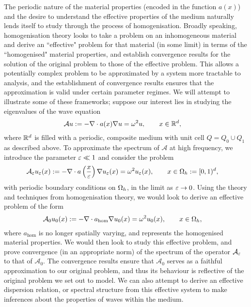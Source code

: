 The periodic nature of the material properties (encoded in the function $a(x)$) and the desire to understand the effective properties of the medium naturally lends itself to study through the process of homogenisation.
Broadly speaking, homogenisation theory looks to take a problem on an inhomogeneous material and derive an ``effective" problem for that material (in some limit) in terms of the ``homogenised" material properties, and establish convergence results for the solution of the original problem to those of the effective problem.
This allows a potentially complex problem to be approximated by a system more tractable to analysis, and the establishment of convergence results ensures that the approximation is valid under certain parameter regimes.
We will attempt to illustrate some of these frameworks; suppose our interest lies in studying the eigenvalues of the wave equation
\begin{align*}
	\mathcal{A}u &:= -\nabla\cdot a(x)\nabla u = \omega^2 u, \qquad x\in\mathbb{R}^d,
\end{align*}
where $\mathbb{R}^d$ is filled with a periodic, composite medium with unit cell $Q=Q_0\cup Q_1$ as described above.
To approximate the spectrum of $\mathcal{A}$ at high frequency, we introduce the parameter $\varepsilon\ll 1$ and consider the problem
\begin{align*}
	\mathcal{A}_{\varepsilon}u_{\varepsilon}(x) &:= -\nabla\cdot a\left( \frac{x}{\varepsilon} \right)\nabla u_{\varepsilon}(x) = \omega^2 u_{\varepsilon}(x), \qquad x\in\Omega_{h}:=[0,1)^d,
\end{align*}
with periodic boundary conditions on $\Omega_h$, in the limit as $\varepsilon\rightarrow0$.
Using the theory and techniques from homogenisation theory, we would look to derive an effective problem of the form
\begin{align*}
	\mathcal{A}_0 u_0(x) &:= -\nabla\cdot a_{\mathrm{hom}}\nabla u_0(x) = \omega^2 u_0(x), \qquad x\in\Omega_h,
\end{align*} 
where $a_{\mathrm{hom}}$ is no longer spatially varying, and represents the homogenised material properties.
We would then look to study this effective problem, and prove convergence (in an appropriate norm) of the spectrum of the operator $\mathcal{A}_{\varepsilon}$ to that of $\mathcal{A}_0$.
The convergence results ensure that $\mathcal{A}_0$ serves as a faithful approximation to our original problem, and thus its behaviour is reflective of the original problem we set out to model.
We can also attempt to derive an effective dispersion relation, or spectral structure from this effective system to make inferences about the properties of waves within the medium.
